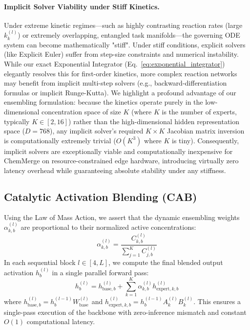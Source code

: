 \paragraph{Implicit Solver Viability under Stiff Kinetics.}
Under extreme kinetic regimes---such as highly contrasting reaction rates (large $k_k^{(l)}$) or extremely overlapping, entangled task manifolds---the governing ODE system can become mathematically "stiff". Under stiff conditions, explicit solvers (like Explicit Euler) suffer from step-size constraints and numerical instability. While our exact Exponential Integrator (Eq.~\ref{eq:exponential_integrator}) elegantly resolves this for first-order kinetics, more complex reaction networks may benefit from implicit multi-step solvers (e.g., backward-differentiation formulas or implicit Runge-Kutta). We highlight a profound advantage of our ensembling formulation: because the kinetics operate purely in the low-dimensional concentration space of size $K$ (where $K$ is the number of experts, typically $K \in [2, 16]$) rather than the high-dimensional hidden representation space ($D = 768$), any implicit solver's required $K \times K$ Jacobian matrix inversion is computationally extremely trivial ($O(K^3)$ where $K$ is tiny). Consequently, implicit solvers are exceptionally viable and computationally inexpensive for ChemMerge on resource-constrained edge hardware, introducing virtually zero latency overhead while guaranteeing absolute stability under any stiffness.

\subsection{Catalytic Activation Blending (CAB)}
Using the Law of Mass Action, we assert that the dynamic ensembling weights $\alpha_{k, b}^{(l)}$ are proportional to their normalized active concentrations:
\begin{equation}
\alpha_{k, b}^{(l)} = \frac{C_{k, b}^{(l)}}{\sum_{j=1}^K C_{j, b}^{(l)}}
\label{eq:mass_action}
\end{equation}
In each sequential block $l \in [4, L]$, we compute the final blended output activation $h_b^{(l)}$ in a single parallel forward pass:
\begin{equation}
h_b^{(l)} = h_{\text{base}, b}^{(l)} + \sum_{k=1}^K \alpha_{k, b}^{(l)} h_{\text{expert}, k, b}^{(l)}
\label{eq:blended_activation}
\end{equation}
where $h_{\text{base}, b}^{(l)} = h_b^{(l-1)} W_{\text{base}}^{(l)}$ and $h_{\text{expert}, k, b}^{(l)} = h_b^{(l-1)} A_k^{(l)} B_k^{(l)}$. This ensures a single-pass execution of the backbone with zero-inference mismatch and constant $O(1)$ computational latency.
